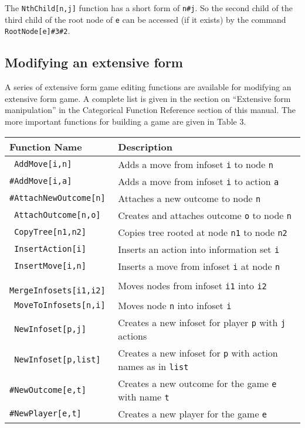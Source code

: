 The \verb+NthChild[n,j]+ function has a short form of \verb+n#j+.  So
the second child of the third child of the root node of \verb+e+ can
be accessed (if it exists) by the command \verb+RootNode[e]#3#2+.  

\subsection{Modifying an extensive form}

A series of extensive form game editing functions are available for
modifying an extensive form game. A complete list is given in the
section on ``Extensive form manipulation'' in the Categorical Function
Reference section of this manual.  The more important functions for
building a game are given in Table 3.

\begin{table}[htp]
\begin{center}
\begin{tabular} {|l||l|} \hline
Function Name	& Description \\ 
\hline
\verb+ AddMove[i,n]+ &Adds a move from infoset \verb+i+ to node \verb+n+ \\
\verb+#AddMove[i,a]+ &Adds a move from infoset \verb+i+ to action \verb+a+ \\
\verb+#AttachNewOutcome[n]+ &Attaches a new outcome to node \verb+n+ \\
\verb+ AttachOutcome[n,o]+ &Creates and attaches outcome \verb+o+ to node \verb+n+ \\
\verb+ CopyTree[n1,n2]+ &Copies tree rooted at node \verb+n1+ to node \verb+n2+ \\
\verb+ InsertAction[i]+ &Inserts an action into information set \verb+i+ \\
\verb+ InsertMove[i,n]+ &Inserts a move from infoset \verb+i+ at node \verb+n+\\
\verb+ MergeInfosets[i1,i2]+ &Moves nodes from infoset \verb+i1+ into \verb+i2+\\
\verb+ MoveToInfosets[n,i]+ &Moves node \verb+n+ into infoset \verb+i+\\
\verb+ NewInfoset[p,j]+ &Creates a new infoset for player \verb+p+ with \verb+j+ actions\\
\verb+ NewInfoset[p,list]+ &Creates a new infoset for \verb+p+ with action names as in \verb+list+\\
\verb+#NewOutcome[e,t]+ &Creates a new outcome for the game \verb+e+
with name \verb+t+\\
\verb+#NewPlayer[e,t]+ &Creates a new player for the game \verb+e+

\end{tabular}
\end{center}
\end{table}
